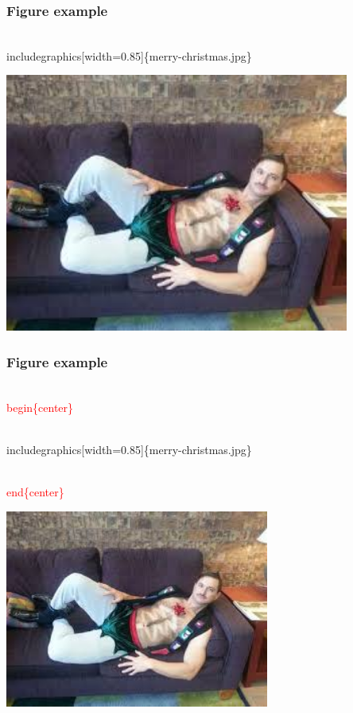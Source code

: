 \documentclass[10pt]{beamer}
\newcommand{\code}{\textcolor{red}}
\begin{document}
\begin{frame}
  \frametitle{Figure example}
  \begin{semiverbatim}

\\includegraphics[width=0.85\textwidth]\{merry-christmas.jpg\}
  \end{semiverbatim}
  
        \includegraphics[width=0.85\textwidth]{merry-christmas.jpg}

\end{frame}
 
 \begin{frame}
  \frametitle{Figure example}
  
  \begin{center}
  \begin{semiverbatim}

\code{\\begin\{center\}}

\\includegraphics[width=0.85\textwidth]\{merry-christmas.jpg\}

\code{\\end\{center\}}

  \end{semiverbatim}
  \end{center}
  
  \begin{center}
        \includegraphics[width=0.65\textwidth]{merry-christmas.jpg}
   \end{center}

\end{frame}
\end{document}
